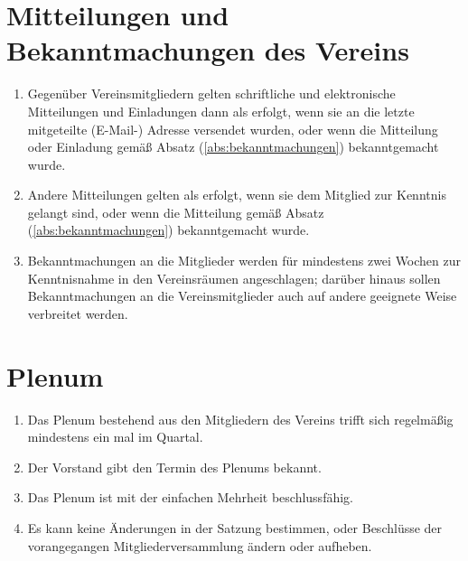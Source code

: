 \documentclass[ngerman]{scrartcl}
\begin{document}
\section{Mitteilungen und Bekanntmachungen des Vereins}
\label{sec:mitteilungen_und_bekanntmachungen_des_vereins}
\begin{enumerate}
 \item Gegenüber Vereinsmitgliedern gelten schriftliche und elektronische
 Mitteilungen und Einladungen dann als erfolgt, wenn sie an die letzte
 mitgeteilte (E-Mail-) Adresse versendet wurden, oder wenn die Mitteilung
 oder Einladung gemäß Absatz (\ref{abs:bekanntmachungen}) bekanntgemacht wurde.

 \item Andere Mitteilungen gelten als erfolgt, wenn sie dem
 Mitglied zur Kenntnis gelangt sind, oder wenn die Mitteilung
 gemäß Absatz (\ref{abs:bekanntmachungen}) bekanntgemacht wurde.

 \item \label{abs:bekanntmachungen}
 Bekanntmachungen an die Mitglieder werden für mindestens
 zwei Wochen zur Kenntnisnahme in den Vereinsräumen
 angeschlagen; darüber hinaus sollen Bekanntmachungen an die 
 Vereinsmitglieder auch auf andere geeignete Weise verbreitet
 werden.
\end{enumerate}
\section{Plenum}
\label{sec:plenum}
\begin{enumerate}
 \item Das Plenum bestehend aus den Mitgliedern des Vereins trifft sich regelmäßig mindestens ein mal im Quartal.
 \item Der Vorstand gibt den Termin des Plenums bekannt.
 \item Das Plenum ist mit der einfachen Mehrheit beschlussfähig.
 \item Es kann keine Änderungen in der Satzung bestimmen, oder Beschlüsse der vorangegangen Mitgliederversammlung ändern oder aufheben.
\end{enumerate}
\end{document}
